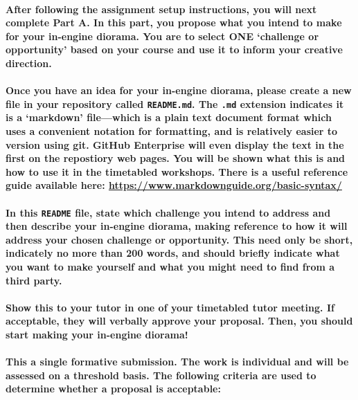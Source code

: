 \documentclass{../../fal_assignment}
\begin{document}
\paragraph{After following the assignment setup instructions, you will next complete Part A. In this part, you propose what you intend to make for your in-engine diorama. You are to select \textbf{ONE} `challenge or opportunity' based on your course and use it to inform your creative direction.} 

\paragraph{Once you have an idea for your in-engine diorama, please create a new file in your repository called \texttt{README.md}. The \texttt{.md} extension indicates it is a `markdown' file---which is a plain text document format which uses a convenient notation for formatting, and is relatively easier to version using git. GitHub Enterprise will even display the text in the first on the repostiory web pages. You will be shown what this is and how to use it in the timetabled workshops. There is a useful reference guide available here: \url{https://www.markdownguide.org/basic-syntax/}}

\paragraph{In this \texttt{README} file, state which challenge you intend to address and then describe your in-engine diorama, making reference to how it will address your chosen challenge or opportunity. This need only be short, indicately no more than 200 words, and should briefly indicate what you want to make yourself and what you might need to find from a third party.}

\paragraph{Show this to your tutor in one of your timetabled tutor meeting. If acceptable, they will verbally approve your proposal. Then, you should start making your in-engine diorama!}

\paragraph{This a \textbf{single formative submission}. The work is \textbf{individual} and will be assessed on a \textbf{threshold} basis. The following criteria are used to determine whether a proposal is acceptable:}
\end{document}
